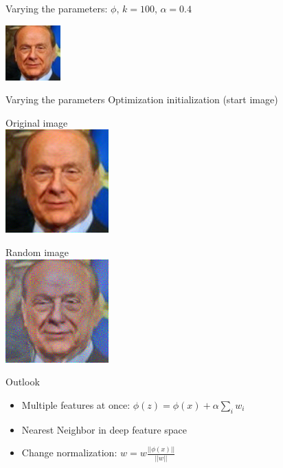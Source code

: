 \documentclass[11pt]{beamer}
\begin{document}
\begin{frame}{Varying the parameters: $\phi$, {\tiny $k=100$, $\alpha=0.4$}}{}
\begin{minipage}{0.3\textwidth}
	
		\includegraphics[width=80px]{../pictures/outputs/layer_comparison/persons/Silvio_Berlusconi_0023/Senior_alpha-0.4_k-2002017-02-08_23-53-43.png}\\

	\end{minipage}%
\end{frame}


\begin{frame}{Varying the parameters} {Optimization initialization (start image)}
	\centering
	\begin{minipage}{0.5\textwidth}
		\centering
		Original image\\
		\includegraphics[width=150px]{../pictures/outputs/rand-vs-start/persons/Silvio_Berlusconi_0023/Senior_alpha-0.4_k-2002017-02-09_00-17-35.png}
		
	\end{minipage}%
	\begin{minipage}{0.5\textwidth}
		\centering
		Random image\\
		\includegraphics[width=150px]{../pictures/outputs/rand-vs-start/persons/Silvio_Berlusconi_0023/Senior_alpha-0.4_k-2002017-02-09_00-12-47.png}
		\end{minipage}%
\end{frame}

\begin{frame}{Outlook}
	\begin{itemize}
		\setlength\itemsep{1em}
		\item Multiple features at once: $\phi(z) = \phi(x) + \alpha \sum_{i} w_i$
		\item Nearest Neighbor in deep feature space
		\item Change normalization: $w = w\frac{||\phi(x)||}{||w||}$
	\end{itemize}
\end{frame}
\end{document}
